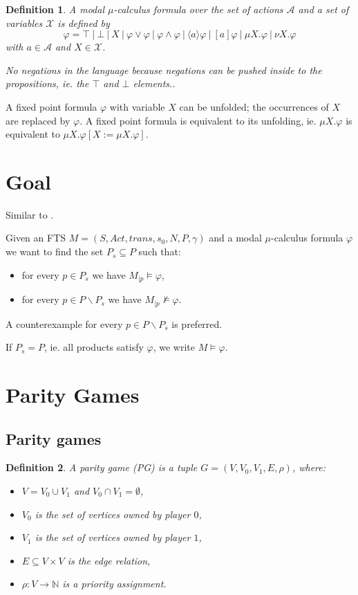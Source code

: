\documentclass[]{article}
\newtheorem{definition}{Definition}[section]
\begin{document}
\begin{definition}\cite{Bradfield2018}
	A modal $\mu$-calculus formula over the set of actions $\mathcal{A}$ and a set of variables $\mathcal{X}$ is defined by
	\[ \varphi = \top\ |\ \bot\ |\ X\ |\ \varphi \vee \varphi\ |\ \varphi \wedge \varphi\ |\ \langle a \rangle \varphi\ |\ [a]\varphi\ |\ \mu X.\varphi\ |\ \nu X.\varphi \]
	with $a \in \mathcal{A}$ and $X \in \mathcal{X}$. 
	
	
	No negations in the language because negations can be pushed inside to the propositions, ie. the $\top$ and $\bot$ elements..
\end{definition}
A fixed point formula $\varphi$ with variable $X$ can be unfolded; the occurrences of $X$ are replaced by $\varphi$. A fixed point formula is equivalent to its unfolding, ie. $\mu X. \varphi$ is equivalent to $\mu X. \varphi[X:=\mu X. \varphi]$. \cite{Bradfield2018}
\section{Goal}
Similar to \cite{inproceedings}.

Given an FTS $M = (S, Act, trans, s_0, N, P, \gamma)$ and a modal $\mu$-calculus formula $\varphi$ we want to find the set $P_s \subseteq P$ such that:
\begin{itemize}
	\item for every $p \in P_s$ we have $M_{|p} \models \varphi$,
	\item for every $p \in P \backslash P_s$ we have $M_{|p} \not\models \varphi$.
\end{itemize}
A counterexample for every $p \in P \backslash P_s$ is preferred.

If $P_s = P$, ie. all products satisfy $\varphi$, we write $M \models \varphi$.

\section{Parity Games}
\subsection{Parity games}
\begin{definition}
	A parity game (PG) is a tuple $G = (V, V_0, V_1, E, \rho)$, where:
	\begin{itemize}
		\item $V = V_0 \cup V_1$ and $V_0 \cap V_1 = \emptyset$,
		\item $V_0$ is the set of vertices owned by player $0$,
		\item $V_1$ is the set of vertices owned by player $1$, 
		\item $E \subseteq V \times V$ is the edge relation,
		\item $\rho :  V \rightarrow \mathbb{N}$ is a priority assignment.
	\end{itemize}
\end{definition}
\end{document}
